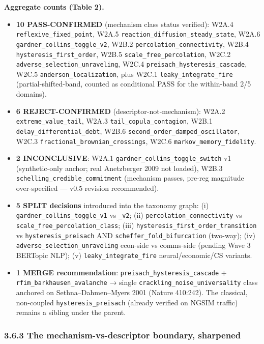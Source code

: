 \documentclass[
  11pt]{article}
\providecommand{\tightlist}{%
  \setlength{\itemsep}{0pt}\setlength{\parskip}{0pt}}
\begin{document}
\textbf{Aggregate counts (Table 2).}

\begin{itemize}
\tightlist
\item
  \textbf{10 PASS-CONFIRMED} (mechanism class status verified):
  W2A.4 \texttt{reflexive\_fixed\_point},
  W2A.5 \texttt{reaction\_diffusion\_steady\_state},
  W2A.6 \texttt{gardner\_collins\_toggle\_v2},
  W2B.2 \texttt{percolation\_connectivity},
  W2B.4 \texttt{hysteresis\_first\_order},
  W2B.5 \texttt{scale\_free\_percolation},
  W2C.2 \texttt{adverse\_selection\_unraveling},
  W2C.4 \texttt{preisach\_hysteresis\_cascade},
  W2C.5 \texttt{anderson\_localization},
  plus W2C.1 \texttt{leaky\_integrate\_fire} (partial-shifted-band,
  counted as conditional PASS for the within-band 2/5 domains).
\item
  \textbf{6 REJECT-CONFIRMED} (descriptor-not-mechanism):
  W2A.2 \texttt{extreme\_value\_tail},
  W2A.3 \texttt{tail\_copula\_contagion},
  W2B.1 \texttt{delay\_differential\_debt},
  W2B.6 \texttt{second\_order\_damped\_oscillator},
  W2C.3 \texttt{fractional\_brownian\_crossings},
  W2C.6 \texttt{markov\_memory\_fidelity}.
\item
  \textbf{2 INCONCLUSIVE}:
  W2A.1 \texttt{gardner\_collins\_toggle\_switch} v1 (synthetic-only
  anchor; real Anetzberger 2009 not loaded),
  W2B.3 \texttt{schelling\_credible\_commitment} (mechanism passes,
  pre-reg magnitude over-specified --- v0.5 revision recommended).
\item
  \textbf{5 SPLIT decisions} introduced into the taxonomy graph:
  (i) \texttt{gardner\_collins\_toggle\_v1} vs \texttt{\_v2};
  (ii) \texttt{percolation\_connectivity} vs
  \texttt{scale\_free\_percolation\_class};
  (iii) \texttt{hysteresis\_first\_order\_transition} vs
  \texttt{hysteresis\_preisach} AND
  \texttt{scheffer\_fold\_bifurcation} (two-way);
  (iv) \texttt{adverse\_selection\_unraveling} econ-side vs comms-side
  (pending Wave 3 BERTopic NLP);
  (v) \texttt{leaky\_integrate\_fire} neural/economic/CS variants.
\item
  \textbf{1 MERGE recommendation}:
  \texttt{preisach\_hysteresis\_cascade} +
  \texttt{rfim\_barkhausen\_avalanche} → single
  \texttt{crackling\_noise\_universality} class anchored on
  Sethna--Dahmen--Myers 2001 (Nature 410:242). The classical, non-coupled
  \texttt{hysteresis\_preisach} (already verified on NGSIM traffic)
  remains a sibling under the parent.
\end{itemize}

\subsubsection{3.6.3 The mechanism-vs-descriptor boundary,
sharpened}\label{363-mechanism-vs-descriptor-boundary-sharpened}
\end{document}

